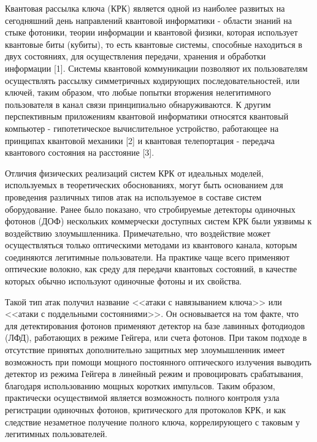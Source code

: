 
{\actuality} 

	Квантовая рассылка ключа (КРК) является одной из наиболее развитых на сегодняшний день направлений квантовой информатики - области знаний на стыке фотоники, теории информации и квантовой физики, которая использует квантовые биты (кубиты), то есть квантовые системы, способные находиться в двух состояниях, для осуществления передачи, хранения и обработки информации [1]. Системы квантовой коммуникации позволяют их пользователям осуществлять рассылку симметричных кодирующих последовательностей, или ключей, таким образом, что любые попытки вторжения нелегитимного пользователя в канал связи принципиально обнаруживаются. К другим перспективным приложениям квантовой информатики относятся квантовый компьютер - гипотетическое вычислительное устройство, работающее на принципах квантовой механики [2] и квантовая телепортация - передача квантового состояния на расстояние [3].
	
	Отличия физических реализаций систем КРК от идеальных моделей, используемых в теоретических обоснованиях, могут быть основанием для проведения различных типов атак на используемое в составе систем оборудование. Ранее было показано, что стробируемые детекторы одиночных фотонов (ДОФ) нескольких коммерчески доступных систем КРК были уязвимы к воздействию злоумышленника. Примечательно, что воздействие может осуществляться только оптическими методами из квантового канала, которым соединяются легитимные пользователи. На практике чаще всего применяют оптические волокно, как среду для передачи квантовых состояний, в качестве которых обычно используют одиночные фотоны и их свойства. 
	
	Такой тип атак получил название <<атаки с навязыванием ключа>> или <<атаки с поддельными состояниями>>. Он основывается на том факте, что для детектирования фотонов применяют детектор на базе лавинных фотодиодов (ЛФД), работающих в режиме Гейгера, или счета фотонов. При таком подходе в отсутствие принятых дополнительно защитных мер злоумышленник имеет возможность при помощи мощного постоянного оптического излучения выводить детектор из режима Гейгера в линейный режим и провоцировать срабатывания, благодаря использованию мощных коротких импульсов. Таким образом, практически осуществимой является возможность полного контроля узла регистрации одиночных фотонов, критического для протоколов КРК, и как следствие незаметное получение полного ключа, коррелирующего с таковым у легитимных пользователей. 
	
